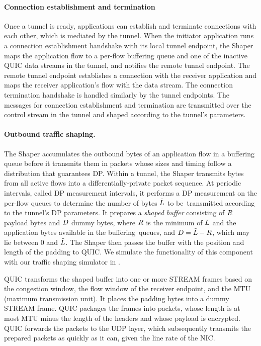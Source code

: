 \paragraph{Connection establishment and termination}
Once a tunnel is ready, applications can establish and terminate connections with each other, which is mediated by the tunnel.
When the initiator application runs a connection establishment handshake with its local tunnel endpoint, the Shaper maps the application flow to a per-flow buffering queue and one of the inactive QUIC data streams in the tunnel, and notifies the remote tunnel endpoint.
The remote tunnel endpoint establishes a connection with the receiver application and maps the receiver application's flow with the data stream.
The connection termination handshake is handled similarly by the tunnel endpoints.
The messages for connection establishment and termination are transmitted over the control stream in the tunnel and shaped according to the tunnel's parameters.

\paragraph{Outbound traffic shaping.}
The Shaper accumulates the outbound bytes of an application flow in a buffering queue before it transmits them in packets whose sizes and timing follow a distribution that guarantees DP.
Within a tunnel, the Shaper transmits bytes from all active flows into a differentially-private packet sequence.
At periodic intervals, called DP measurement intervals, it performs a DP measurement on the per-flow queues to determine the number of bytes $\tilde{L}$ to be~transmitted according to the tunnel's DP parameters.
It prepares a {\em shaped buffer} consisting of $R$ payload bytes and $D$ dummy bytes, where $R$ is the minimum of $\tilde{L}$ and the application bytes available in the buffering~queues, and $D = \tilde{L} - R$, which may lie between 0 and $\tilde{L}$.
The Shaper then passes the buffer with the position and length of the padding to QUIC. We simulate the functionality of this component with our traffic shaping simulator in .

QUIC transforms the shaped buffer into one or more STREAM frames based on the
congestion window, the flow window of the receiver endpoint, and the MTU
(maximum transmission unit).
It places the padding bytes into a dummy STREAM frame.
QUIC packages the frames into packets, whose length is at most MTU minus the length of the headers and whose payload is encrypted.
QUIC forwards the packets to the UDP layer, which subsequently transmits the prepared packets as quickly as it can, given the line rate of the NIC.

